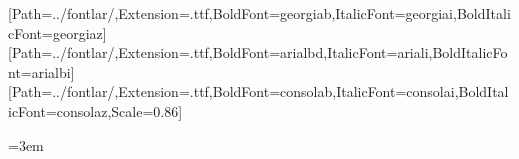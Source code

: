 \usepackage{fontspec}
\setmainfont{georgia}[Path=../fontlar/,Extension=.ttf,BoldFont=georgiab,ItalicFont=georgiai,BoldItalicFont=georgiaz]
\setsansfont{arial}[Path=../fontlar/,Extension=.ttf,BoldFont=arialbd,ItalicFont=ariali,BoldItalicFont=arialbi]
\setmonofont{consola}[Path=../fontlar/,Extension=.ttf,BoldFont=consolab,ItalicFont=consolai,BoldItalicFont=consolaz,Scale=0.86]
\usepackage[a4paper,left=2.2cm,right=2.2cm,top=1.9cm,bottom=1.8cm]{geometry}
\usepackage{xcolor,graphicx,titlesec,enumitem,amsmath,booktabs,xltabular,listings,fancyhdr,caption}
\emergencystretch=3em
\color{ink}
\titleformat{\section}{\sffamily\bfseries\large\color{acc}}{}{0pt}{}
\titlespacing*{\section}{0pt}{9pt}{3pt}
\titleformat{\subsection}{\sffamily\bfseries\normalsize}{}{0pt}{}
\titlespacing*{\subsection}{0pt}{6pt}{2pt}
\setlength{\parindent}{0pt}\setlength{\parskip}{4pt plus 1pt}
\pagestyle{fancy}\fancyhf{}\renewcommand{\headrulewidth}{0.3pt}
\fancyfoot[C]{\sffamily\footnotesize\color{muted}\thepage}
\newcommand{\baslik}[2]{%
  {\sffamily\color{muted}\small EHB415 Dönem Projesi \textbullet\ 2026--2027 Güz\par}
  {\sffamily\bfseries\Large Study of Simulation Tools: #1\par}
  {\sffamily\small #2\par}
  \vspace{-2pt}{\color{acc!40}\rule{\textwidth}{0.8pt}}\par}
